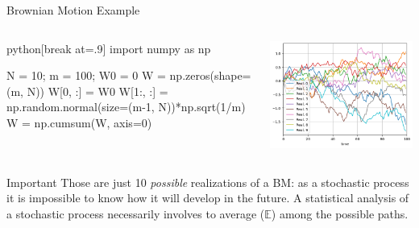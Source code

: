 \documentclass{beamer}
\begin{document}
\begin{frame}[fragile]{Brownian Motion Example}
\begin{columns}
\begin{mintedbox}{python}[break at=.9\textheight]
import numpy as np

N = 10; m = 100; W0 = 0
W = np.zeros(shape=(m, N))
W[0, :] = W0
W[1:, :] = np.random.normal(size=(m-1, N))*np.sqrt(1/m)
W = np.cumsum(W, axis=0)
\end{mintedbox}
    \includegraphics[width=1.\linewidth]{images/bm_realizations}
\end{columns}
\begin{block}{Important}
Those are just 10 \emph{possible} realizations of a  BM: as a stochastic process it is impossible to know how it will develop in the future. A statistical analysis of a stochastic process necessarily involves to average ($\mathbb{E}$) among the possible paths.
\end{block}
\end{frame}
\end{document}
